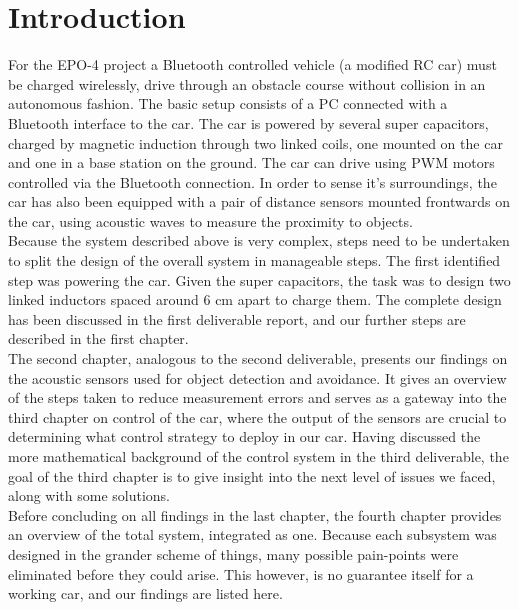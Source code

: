 \documentclass[11pt,titlepage]{report}
\begin{document}
\chapter{Introduction}
For the EPO-4 project a Bluetooth controlled vehicle (a modified RC car) must be charged wirelessly, drive through an obstacle course without collision in an autonomous fashion. The basic setup consists of a PC connected with a Bluetooth interface to the car. The car is powered by several super capacitors, charged by magnetic induction through two linked coils, one mounted on the car and one in a base station on the ground. The car can drive using PWM motors controlled via the Bluetooth connection. In order to sense it's surroundings, the car has also been equipped with a pair of distance sensors mounted frontwards on the car, using acoustic waves to measure the proximity to objects.\\
Because the system described above is very complex, steps need to be undertaken to split the design of the overall system in manageable steps. The first identified step was powering the car. Given the super capacitors, the task was to design two linked inductors spaced around 6 cm apart to charge them. The complete design has been discussed in the first deliverable report, and our further steps are described in the first chapter.\\
The second chapter, analogous to the second deliverable, presents our findings on the acoustic sensors used for object detection and avoidance. It gives an overview of the steps taken to reduce measurement errors and serves as a gateway into the third chapter on control of the car, where the output of the sensors are crucial to determining what control strategy to deploy in our car. Having discussed the more mathematical background of the control system in the third deliverable, the goal of the third chapter is to give insight into the next level of issues we faced, along with some solutions.\\
Before concluding on all findings in the last chapter, the fourth chapter provides an overview of the total system, integrated as one. Because each subsystem was designed in the grander scheme of things, many possible pain-points were eliminated before they could arise. This however, is no guarantee itself for a working car, and our findings are listed here.
\end{document}
